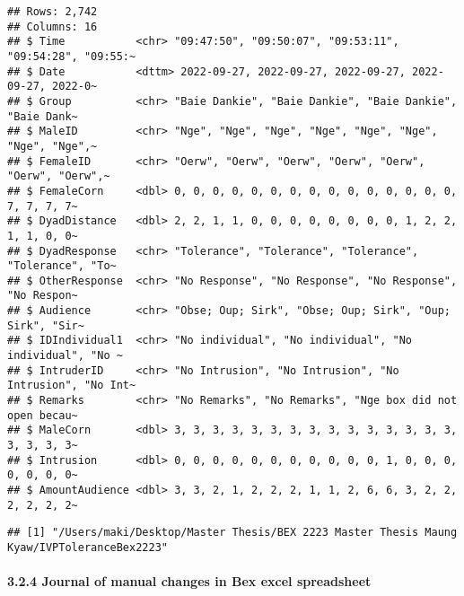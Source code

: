 \documentclass[
]{article}
\begin{document}
\begin{verbatim}
## Rows: 2,742
## Columns: 16
## $ Time           <chr> "09:47:50", "09:50:07", "09:53:11", "09:54:28", "09:55:~
## $ Date           <dttm> 2022-09-27, 2022-09-27, 2022-09-27, 2022-09-27, 2022-0~
## $ Group          <chr> "Baie Dankie", "Baie Dankie", "Baie Dankie", "Baie Dank~
## $ MaleID         <chr> "Nge", "Nge", "Nge", "Nge", "Nge", "Nge", "Nge", "Nge",~
## $ FemaleID       <chr> "Oerw", "Oerw", "Oerw", "Oerw", "Oerw", "Oerw", "Oerw",~
## $ FemaleCorn     <dbl> 0, 0, 0, 0, 0, 0, 0, 0, 0, 0, 0, 0, 0, 0, 0, 7, 7, 7, 7~
## $ DyadDistance   <dbl> 2, 2, 1, 1, 0, 0, 0, 0, 0, 0, 0, 0, 1, 2, 2, 1, 1, 0, 0~
## $ DyadResponse   <chr> "Tolerance", "Tolerance", "Tolerance", "Tolerance", "To~
## $ OtherResponse  <chr> "No Response", "No Response", "No Response", "No Respon~
## $ Audience       <chr> "Obse; Oup; Sirk", "Obse; Oup; Sirk", "Oup; Sirk", "Sir~
## $ IDIndividual1  <chr> "No individual", "No individual", "No individual", "No ~
## $ IntruderID     <chr> "No Intrusion", "No Intrusion", "No Intrusion", "No Int~
## $ Remarks        <chr> "No Remarks", "No Remarks", "Nge box did not open becau~
## $ MaleCorn       <dbl> 3, 3, 3, 3, 3, 3, 3, 3, 3, 3, 3, 3, 3, 3, 3, 3, 3, 3, 3~
## $ Intrusion      <dbl> 0, 0, 0, 0, 0, 0, 0, 0, 0, 0, 0, 1, 0, 0, 0, 0, 0, 0, 0~
## $ AmountAudience <dbl> 3, 3, 2, 1, 2, 2, 2, 1, 1, 2, 6, 6, 3, 2, 2, 2, 2, 2, 2~
\end{verbatim}

\begin{verbatim}
## [1] "/Users/maki/Desktop/Master Thesis/BEX 2223 Master Thesis Maung Kyaw/IVPToleranceBex2223"
\end{verbatim}

\hypertarget{journal-of-manual-changes-in-bex-excel-spreadsheet}{%
\paragraph{3.2.4 Journal of manual changes in Bex excel
spreadsheet}\label{journal-of-manual-changes-in-bex-excel-spreadsheet}}
\end{document}
